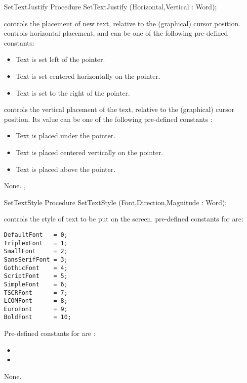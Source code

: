 \begin{procedure}{SetTextJustify}
\Declaration
Procedure SetTextJustify (Horizontal,Vertical : Word);

\Description
{} controls the placement of new text, relative to the 
(graphical) cursor position.  controls horizontal placement, and can be
one of the following pre-defined constants:

\begin{itemize}
\item {} Text is set left of the pointer.
\item {} Text is set centered horizontally on the pointer.
\item {} Text is set to the right of the pointer.
\end{itemize}
 controls the vertical placement of the text, relative to the
(graphical) cursor position. Its value can be one of the following
pre-defined constants :

\begin{itemize}
\item {} Text is placed under the pointer.
\item {} Text is placed centered vertically on the pointer.
\item {}Text is placed above the pointer.
\end{itemize}

\Errors
None.
\SeeAlso
{}, 
\end{procedure}

\begin{procedure}{SetTextStyle}
\Declaration
Procedure SetTextStyle (Font,Direction,Magnitude : Word);

\Description
{} controls the style of text to be put on the screen.
pre-defined constants for  are:

\begin{verbatim}
DefaultFont   = 0;
TriplexFont   = 1;
SmallFont     = 2;
SansSerifFont = 3;
GothicFont    = 4;
ScriptFont    = 5;
SimpleFont    = 6;
TSCRFont      = 7;
LCOMFont      = 8;
EuroFont      = 9;
BoldFont      = 10;
\end{verbatim}
Pre-defined constants for  are :

\begin{itemize}
\item {}
\item {}
\end{itemize}
\Errors
None.
\SeeAlso
{} 
\end{procedure}

